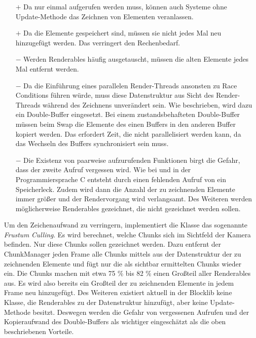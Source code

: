 \begin{itemize}
	\item[$+$] Da  nur einmal aufgerufen werden muss, können auch Systeme ohne Update-Methode das Zeichnen von Elementen veranlassen.
	\item[$+$] Da die Elemente gespeichert sind, müssen sie nicht jedes Mal neu hinzugefügt werden. Das verringert den Rechenbedarf.
	\item[$-$] Werden Renderables häufig ausgetauscht, müssen die alten Elemente jedes Mal entfernt werden.
	\item[$-$] Da die Einführung eines parallelen Render-Threads ansonsten zu Race Conditions führen würde, muss diese Datenstruktur aus Sicht des Render-Threads während des Zeichnens unverändert sein. Wie beschrieben, wird dazu ein Double-Buffer eingesetzt. Bei einem zustandsbehafteten Double-Buffer müssen beim Swap die Elemente des einen Buffers in den anderen Buffer kopiert werden. Das erfordert Zeit, die nicht parallelisiert werden kann, da das Wechseln des Buffers synchronisiert sein muss.
	\item[$-$] Die Existenz von paarweise aufzurufenden Funktionen birgt die Gefahr, dass der zweite Aufruf vergessen wird. Wie bei  und  in der Programmiersprache C entsteht durch einen fehlenden Aufruf von  ein Speicherleck. Zudem wird dann die Anzahl der zu zeichnenden Elemente immer größer und der Rendervorgang wird verlangsamt. Des Weiteren werden möglicherweise Renderables gezeichnet, die nicht gezeichnet werden sollen.
\end{itemize}

Um den Zeichenaufwand zu verringern, implementiert die Klasse \classChunkManager{} das sogenannte \emph{Frustum Culling}. Es wird berechnet, welche Chunks sich im Sichtfeld der Kamera befinden. Nur diese Chunks sollen gezeichnet werden. Dazu entfernt der ChunkManager jeden Frame alle Chunks mittels  aus der Datenstruktur der zu zeichnenden Elemente und fügt nur die als sichtbar ermittelten Chunks wieder ein. Die Chunks machen mit etwa 
75 \% bis
82 \% einen Großteil aller Renderables aus. Es wird also bereits ein Großteil der zu zeichnenden Elemente in jedem Frame neu hinzugefügt. Des Weiteren existiert aktuell in der Blocklib keine Klasse, die Renderables zu der Datenstruktur hinzufügt, aber keine Update-Methode besitzt. Deswegen werden die Gefahr von vergessenen  Aufrufen und der Kopieraufwand des Double-Buffers als wichtiger eingeschätzt als die oben beschriebenen Vorteile.

